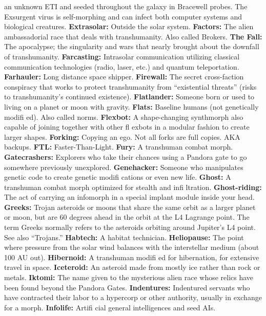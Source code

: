 an unknown ETI and seeded throughout the galaxy in 
Bracewell probes. The Exsurgent virus is self-morphing and 
can infect both computer systems and biological creatures.
\textbf{ Extrasolar:} Outside the solar system.
\textbf{ Factors:} The alien ambassadorial race that deals with 
transhumanity. Also called Brokers.
\textbf{ The Fall:} The apocalypse; the singularity and wars that 
nearly brought about the downfall of transhumanity.
\textbf{ Farcasting:} Intrasolar communication utilizing classical 
communication technologies (radio, laser, etc.) and 
quantum teleportation.
\textbf{ Farhauler:} Long distance space shipper.
\textbf{ Firewall:} The secret cross-faction conspiracy that works 
to protect transhumanity from ``existential threats'' (risks 
to transhumanity's continued existence).
\textbf{ Flatlander:} Someone born or used to living on a planet 
or moon with gravity.
\textbf{ Flats:} Baseline humans (not genetically modiﬁ ed). Also 
called norms.
\textbf{ Flexbot:} A shape-changing synthmorph also capable of 
joining together with other ﬂ exbots in a modular fashion 
to create larger shapes.
\textbf{ Forking:} Copying an ego. Not all forks are full copies. 
AKA backups.
\textbf{ FTL:} Faster-Than-Light.
\textbf{ Fury:} A transhuman combat morph.
\textbf{ Gatecrashers:} Explorers who take their chances using a 
Pandora gate to go somewhere previously unexplored.
\textbf{ Genehacker:} Someone who manipulates genetic code to 
create genetic modiﬁ cations or even new life.
\textbf{ Ghost:} A transhuman combat morph optimized for 
stealth and inﬁ ltration.
\textbf{ Ghost-riding:} The act of carrying an infomorph in a 
special implant module inside your head.
\textbf{ Greeks:} Trojan asteroids or moons that share the same 
orbit as a larger planet or moon, but are 60 degrees 
ahead in the orbit at the L4 Lagrange point. The term 
Greeks normally refers to the asteroids orbiting around 
Jupiter's L4 point. See also ``Trojans.''
\textbf{ Habtech:} A habitat technician.
\textbf{ Heliopause:} The point where pressure from the solar wind 
balances with the interstellar medium (about 100 AU out).
\textbf{ Hibernoid:} A transhuman modiﬁ ed for hibernation, for 
extensive travel in space.
\textbf{ Iceteroid:} An asteroid made from mostly ice rather than 
rock or metals.
\textbf{ Iktomi:} The name given to the mysterious alien race 
whose relics have been found beyond the Pandora Gates.
\textbf{ Indentures:} Indentured servants who have contracted 
their labor to a hypercorp or other authority, usually in 
exchange for a morph.
\textbf{ Infolife:} Artiﬁ cial general intelligences and seed AIs.
